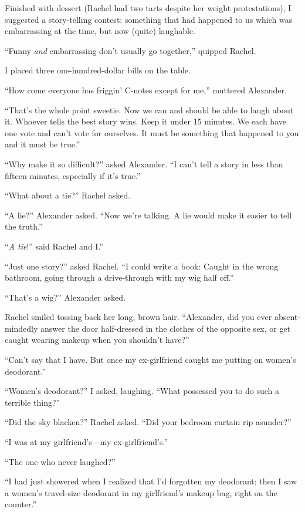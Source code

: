 Finished with dessert (Rachel had two tarts despite her weight
protestations), I suggested a story-telling contest: something that had
happened to us which was embarrassing at the time, but now (quite)
laughable.

``Funny \emph{and} embarrassing don't usually go together,'' quipped
Rachel.

I placed three one-hundred-dollar bills on the table.

``How come everyone has friggin' C-notes except for me,'' muttered
Alexander.

``That's the whole point sweetie. Now we can and should be able to laugh
about it. Whoever tells the best story wins. Keep it under 15 minutes.
We each have one vote and can't vote for ourselves. It must be something
that happened to you and it must be true.''

``Why make it so difficult?'' asked Alexander. ``I can't tell a story in
less than fifteen minutes, especially if it's true.''

``What about a tie?'' Rachel asked.

``A lie?'' Alexander asked. ``Now we're talking. A lie would make it
easier to tell the truth.''

``\emph{A tie}!'' said Rachel and I.''

``Just one story?'' asked Rachel. ``I could write a book: Caught in the
wrong bathroom, going through a drive-through with my wig half off.''

``That's a wig?'' Alexander asked.

Rachel smiled tossing back her long, brown hair. ``Alexander, did you
ever absent-mindedly answer the door half-dressed in the clothes of the
opposite sex, or get caught wearing makeup when you shouldn't have?''

``Can't say that I have. But once my ex-girlfriend caught me putting on
women's deodorant.''

``Women's deodorant?'' I asked, laughing. ``What possessed you to do
such a terrible thing?''

``Did the sky blacken?'' Rachel asked. ``Did your bedroom curtain rip
asunder?''

``I was at my girlfriend's---my ex-girlfriend's.''

``The one who never laughed?''

``I had just showered when I realized that I'd forgotten my deodorant;
then I saw a women's travel-size deodorant in my girlfriend's makeup
bag, right on the counter.''

